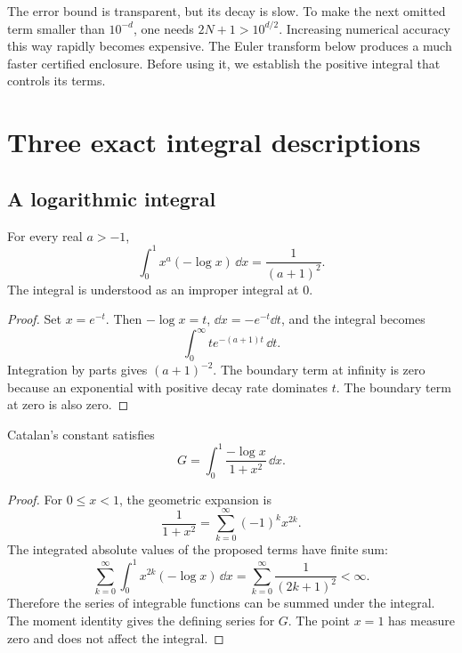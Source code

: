 The error bound is transparent, but its decay is slow. To make the next omitted term smaller than $10^{-d}$, one needs $2N+1>10^{d/2}$. Increasing numerical accuracy this way rapidly becomes expensive. The Euler transform below produces a much faster certified enclosure. Before using it, we establish the positive integral that controls its terms.

\section{Three exact integral descriptions}

\subsection{A logarithmic integral}

\begin{lemma}
\label{lem:c01-moment}
For every real $a>-1$,
\begin{equation}
\int_0^1x^a(-\log x)\,\dd x=\frac1{(a+1)^2}.
\label{eq:c01-moment}
\end{equation}
The integral is understood as an improper integral at $0$.
\end{lemma}

\begin{proof}
Set $x=e^{-t}$. Then $-\log x=t$, $\dd x=-e^{-t}\dd t$, and the integral becomes
\[
\int_0^{\infty}t e^{-(a+1)t}\,\dd t.
\]
Integration by parts gives $(a+1)^{-2}$. The boundary term at infinity is zero because an exponential with positive decay rate dominates $t$. The boundary term at zero is also zero.
\end{proof}

\begin{proposition}
\label{prop:c01-log-integral}
Catalan's constant satisfies
\begin{equation}
G=\int_0^1\frac{-\log x}{1+x^2}\,\dd x.
\label{eq:c01-log-integral}
\end{equation}
\end{proposition}

\begin{proof}
For $0\leq x<1$, the geometric expansion is
\[
\frac1{1+x^2}=\sum_{k=0}^{\infty}(-1)^kx^{2k}.
\]
The integrated absolute values of the proposed terms have finite sum:
\[
\sum_{k=0}^{\infty}\int_0^1x^{2k}(-\log x)\,\dd x
=\sum_{k=0}^{\infty}\frac1{(2k+1)^2}<\infty.
\]
Therefore the series of integrable functions can be summed under the integral. The moment identity gives the defining series for $G$. The point $x=1$ has measure zero and does not affect the integral.
\end{proof}

